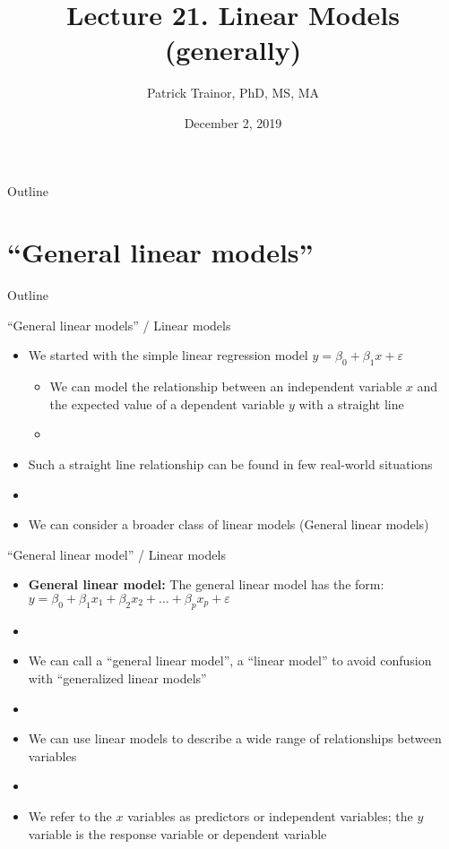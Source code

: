 \documentclass[xcolor=dvipsnames]{beamer}
\title[Lecture 21]{Lecture 21. Linear Models (generally)}
\author[Patrick Trainor]{Patrick Trainor, PhD, MS, MA}
\institute[NMSU]{New Mexico State University}
\date{December 2, 2019}
\begin{document}
\begin{frame}
\maketitle
\end{frame}

\begin{frame}{Outline}
\tableofcontents[hideallsubsections]
\end{frame}

\section{``General linear models''}
\begin{frame}{Outline}
	\tableofcontents[currentsection,subsectionstyle=show/shaded/hide]
\end{frame}

\begin{frame}{``General linear models'' / Linear models}
	\begin{itemize}
		\item We started with the simple linear regression model $y = \beta_0 + \beta_1 x + \varepsilon$ \pause
		\begin{itemize}
			\item We can model the relationship between an independent variable $x$ and the expected value of a dependent variable $y$ with a straight line \pause
			\item[]
		\end{itemize}
		\item Such a straight line relationship can be found in few real-world situations \pause
		\item[]
		\item We can consider a broader class of linear models (General linear models) 
	\end{itemize}
\end{frame}

\begin{frame}{``General linear model'' / Linear models}
	\begin{itemize}
		\item \textbf{General linear model:} The general linear model has the form: $y = \beta_0 + \beta_1 x_1 + \beta_2 x_2 + \hdots + \beta_p x_p + \varepsilon$ \pause
		\item[]
		\item We can call a ``general linear model'', a ``linear model'' to avoid confusion with ``generalized linear models'' \pause
		\item[]
		\item We can use linear models to describe a wide range of relationships between variables \pause
		\item[]
		\item We refer to the $x$ variables as predictors or independent variables; the $y$ variable is the response variable or dependent variable
	\end{itemize}
\end{frame}
\end{document}
